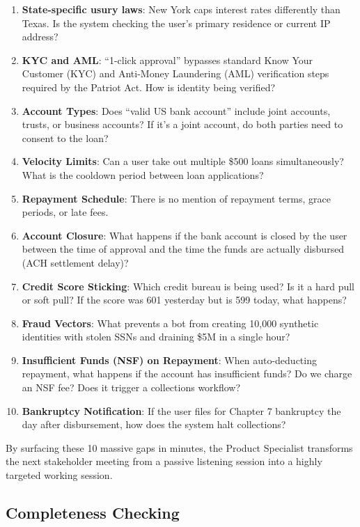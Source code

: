 \documentclass[
  11pt,
  openany,
  oneside]{book}
\providecommand{\tightlist}{%
  \setlength{\itemsep}{0pt}\setlength{\parskip}{0pt}}
\begin{document}
\begin{enumerate}
\def\labelenumi{\arabic{enumi}.}
\tightlist
\item
  \textbf{State-specific usury laws}: New York caps interest rates
  differently than Texas. Is the system checking the user's primary
  residence or current IP address?
\item
  \textbf{KYC and AML}: ``1-click approval'' bypasses standard Know Your
  Customer (KYC) and Anti-Money Laundering (AML) verification steps
  required by the Patriot Act. How is identity being verified?
\item
  \textbf{Account Types}: Does ``valid US bank account'' include joint
  accounts, trusts, or business accounts? If it's a joint account, do
  both parties need to consent to the loan?
\item
  \textbf{Velocity Limits}: Can a user take out multiple \$500 loans
  simultaneously? What is the cooldown period between loan applications?
\item
  \textbf{Repayment Schedule}: There is no mention of repayment terms,
  grace periods, or late fees.
\item
  \textbf{Account Closure}: What happens if the bank account is closed
  by the user between the time of approval and the time the funds are
  actually disbursed (ACH settlement delay)?
\item
  \textbf{Credit Score Sticking}: Which credit bureau is being used? Is
  it a hard pull or soft pull? If the score was 601 yesterday but is 599
  today, what happens?
\item
  \textbf{Fraud Vectors}: What prevents a bot from creating 10,000
  synthetic identities with stolen SSNs and draining \$5M in a single
  hour?
\item
  \textbf{Insufficient Funds (NSF) on Repayment}: When auto-deducting
  repayment, what happens if the account has insufficient funds? Do we
  charge an NSF fee? Does it trigger a collections workflow?
\item
  \textbf{Bankruptcy Notification}: If the user files for Chapter 7
  bankruptcy the day after disbursement, how does the system halt
  collections?
\end{enumerate}

By surfacing these 10 massive gaps in minutes, the Product Specialist
transforms the next stakeholder meeting from a passive listening session
into a highly targeted working session.

\subsection{Completeness Checking}\label{completeness-checking}
\end{document}
